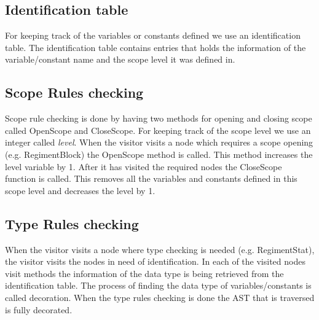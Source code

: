 	\subsection{Identification table}
		For keeping track of the variables or constants defined we use an identification table. The identification table contains entries
		that holds the information of the variable/constant name and the scope level it was defined in.
		
	\subsection{Scope Rules checking}
		Scope rule checking is done by having two methods for opening and closing scope called OpenScope and CloseScope. 
		For keeping track of the scope level we use an integer called {\it level}.
		When the visitor visits a node which requires a scope opening (e.g. RegimentBlock) the OpenScope method is called. 
		This method increases the level variable by 1. After it has visited the required nodes the CloseScope function is called. 
		This removes all the variables and constants defined in this scope level and decreases the level by 1.
	
	\subsection{Type Rules checking}
		When the visitor visits a node where type checking is needed (e.g. RegimentStat), the visitor visits the nodes 
		in need of identification. In each of the visited nodes visit methods the information of the data type is being retrieved 
		from the identification table. The process of finding the data type of variables/constants is called decoration. 
		When the type rules checking is done the AST that is traversed is fully decorated.
		
		